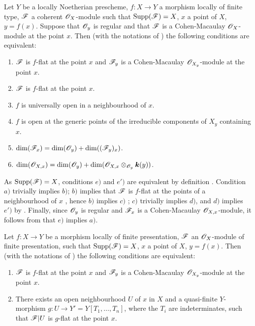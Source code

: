 \begin{proposition}[15.4.2]
\label{IV.15.4.2}
Let $Y$ be a locally Noetherian prescheme, $f:X\to Y$ a morphism locally of finite type, $\mathscr{F}$ a coherent $\mathscr{O}_X$-module such that $\operatorname{Supp}(\mathscr{F})=X$, $x$ a point of $X$, $y=f(x)$.
Suppose that $\mathscr{O}_y$ is regular and that $\mathscr{F}$ is a Cohen-Macaulay $\mathscr{O}_X$-module at the point $x$.
Then \textup{(with the notations of )} the following conditions are equivalent:
\begin{enumerate}[label=\emph{\alph*})]
  \item $\mathscr{F}$ is $f$-flat at the point $x$ and $\mathscr{F}_y$ is a Cohen-Macaulay $\mathscr{O}_{X_y}$-module at the point $x$.
  \item $\mathscr{F}$ is $f$-flat at the point $x$.
  \item $f$ is universally open in a neighbourhood of $x$.
  \item $f$ is open at the generic points of the irreducible components of $X_y$ containing $x$.
  \item $\dim(\mathscr{F}_x)=\dim(\mathscr{O}_y)+\dim((\mathscr{F}_y)_x)$.
  \item[\emph{e}$'$)] $\dim(\mathscr{O}_{X,x})=\dim(\mathscr{O}_y)+\dim(\mathscr{O}_{X,x}\otimes_{\mathscr{O}_y}\boldsymbol{k}(y))$.
\end{enumerate}
\end{proposition}

As $\operatorname{Supp}(\mathscr{F})=X$, conditions $e)$ and $e')$ are equivalent by definition .
Condition $a)$ trivially implies $b)$; $b)$ implies that $\mathscr{F}$ is $f$-flat at the points of a neighbourhood of $x$ , hence $b)$ implies $c)$ ; $c)$ trivially implies $d)$, and $d)$ implies $e')$ by .
Finally, since $\mathscr{O}_y$ is regular and $\mathscr{F}_x$ is a Cohen-Macaulay $\mathscr{O}_{X,x}$-module, it follows from  that $e)$ implies $a)$.

\begin{proposition}[15.4.3]
\label{IV.15.4.3}
Let $f:X\to Y$ be a morphism locally of finite presentation, $\mathscr{F}$ an $\mathscr{O}_X$-module of finite presentation, such that $\operatorname{Supp}(\mathscr{F})=X$, $x$ a point of $X$, $y=f(x)$.
Then \textup{(with the notations of )} the following conditions are equivalent:
\begin{enumerate}[label=\emph{\alph*})]
  \item $\mathscr{F}$ is $f$-flat at the point $x$ and $\mathscr{F}_y$ is a Cohen-Macaulay $\mathscr{O}_{X_y}$-module at the point $x$.
  \item There exists an open neighbourhood $U$ of $x$ in $X$ and a quasi-finite $Y$-morphism $g:U\to Y'=Y[T_1,\ldots,T_n]$, where the $T_i$ are indeterminates, such that $\mathscr{F}|U$ is $g$-flat at the point $x$.
\end{enumerate}
\end{proposition}

